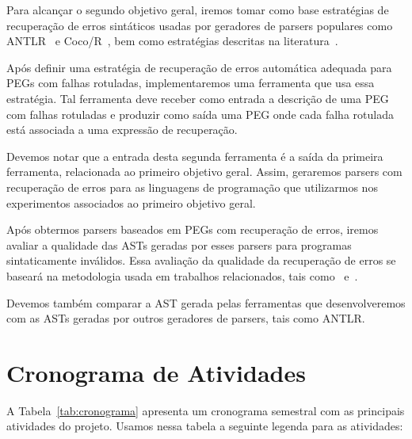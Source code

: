 \documentclass[titlepage,12pt]{article}
\begin{document}
Para alcançar o segundo objetivo geral, iremos tomar como
base estratégias de recuperação de erros sintáticos usadas
por geradores de parsers populares como ANTLR~\cite{parr2013antlr,parr2014antlr}
e Coco/R~\cite{cocomanual}, bem como estratégias descritas
na literatura~\cite{aho1972tptc,wirth1978algorithms,grune2010ptp}.

Após definir uma estratégia de recuperação de erros
automática adequada para PEGs com falhas rotuladas,
implementaremos uma ferramenta que usa essa estratégia.
Tal ferramenta deve receber como entrada a descrição
de uma PEG com falhas rotuladas e produzir como saída
uma PEG onde cada falha rotulada está associada a uma
expressão de recuperação. 

Devemos notar que a entrada desta segunda ferramenta é a
saída da primeira ferramenta, relacionada ao primeiro objetivo
geral. Assim, geraremos parsers com recuperação de erros para
as linguagens de programação que utilizarmos nos experimentos
associados ao primeiro objetivo geral.

Após obtermos parsers baseados em PEGs com recuperação de erros,
iremos avaliar a qualidade das ASTs geradas por esses parsers
para programas sintaticamente inválidos.
Essa avaliação da qualidade da recuperação de erros se
baseará na metodologia usada em trabalhos relacionados,
tais como~\cite{dejonge2012natural} e~\cite{corchuelo2002repair}.

Devemos também comparar a AST gerada pelas ferramentas
que desenvolveremos com as ASTs geradas por outros geradores
de parsers, tais como ANTLR.



\section{Cronograma de Atividades}
\label{sec:crono}

A Tabela~\ref{tab:cronograma} apresenta um cronograma semestral com as
principais atividades do projeto. Usamos nessa tabela a seguinte legenda
para as atividades:
\end{document}

